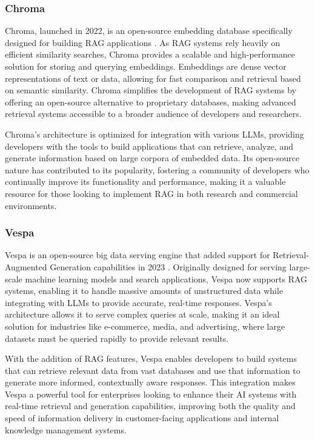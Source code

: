 \subsubsection{Chroma}

Chroma, launched in 2022, is an open-source embedding database specifically designed for building RAG applications \cite{Chroma}. 
As RAG systems rely heavily on efficient similarity searches, Chroma provides a scalable and high-performance solution for storing and querying embeddings. 
Embeddings are dense vector representations of text or data, allowing for fast comparison and retrieval based on semantic similarity. 
Chroma simplifies the development of RAG systems by offering an open-source alternative to proprietary databases, making advanced retrieval systems accessible to a broader audience of developers and researchers.

Chroma's architecture is optimized for integration with various LLMs, providing developers with the tools to build applications that can retrieve, analyze, and generate information based on large corpora of embedded data. 
Its open-source nature has contributed to its popularity, fostering a community of developers who continually improve its functionality and performance, making it a valuable resource for those looking to implement RAG in both research and commercial environments.

\subsubsection{Vespa}

Vespa is an open-source big data serving engine that added support for Retrieval-Augmented Generation capabilities in 2023 \cite{Vespa}. 
Originally designed for serving large-scale machine learning models and search applications, Vespa now supports RAG systems, enabling it to handle massive amounts of unstructured data while integrating with LLMs to provide accurate, real-time responses. 
Vespa's architecture allows it to serve complex queries at scale, making it an ideal solution for industries like e-commerce, media, and advertising, where large datasets must be queried rapidly to provide relevant results.

With the addition of RAG features, Vespa enables developers to build systems that can retrieve relevant data from vast databases and use that information to generate more informed, contextually aware responses. 
This integration makes Vespa a powerful tool for enterprises looking to enhance their AI systems with real-time retrieval and generation capabilities, improving both the quality and speed of information delivery in customer-facing applications and internal knowledge management systems.

